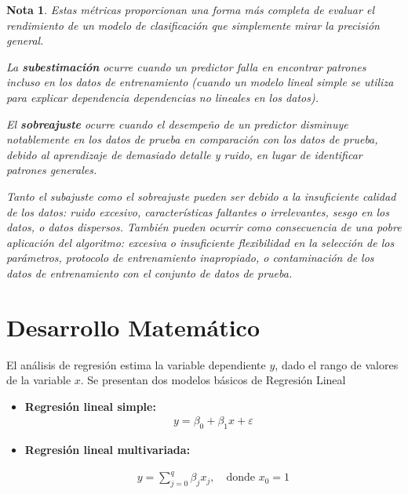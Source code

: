 \documentclass[12pt]{article}
\newtheorem{Note}{Nota}%
\begin{document}
\begin{Note}
Estas métricas proporcionan una forma más completa de evaluar el rendimiento de un modelo de clasificación que simplemente mirar la precisión general.\medskip

 La \textbf{subestimación} ocurre cuando un predictor falla en encontrar patrones incluso en los datos de entrenamiento (cuando un modelo lineal simple se utiliza para explicar dependencia dependencias no lineales en los datos). \medskip
 
 El \textbf{sobreajuste} ocurre cuando el desempeño de un predictor disminuye notablemente en los datos de prueba en comparación con los datos de prueba, debido al aprendizaje de demasiado detalle y ruido, en lugar de identificar patrones generales. \medskip
 
 \noindent Tanto el subajuste como el sobreajuste pueden ser debido a la insuficiente calidad de los datos: ruido excesivo, características faltantes o irrelevantes, sesgo en los datos, o datos dispersos. También pueden ocurrir como consecuencia de una pobre aplicación del algoritmo: excesiva o insuficiente flexibilidad en la selección de los parámetros, protocolo de entrenamiento inapropiado, o contaminación de los datos de entrenamiento con el conjunto de datos de prueba.
\end{Note}

\newpage
\section{Desarrollo Matem\'atico}

El análisis de regresión estima la variable dependiente \( y \), dado el rango de valores de la variable \( x \). Se presentan dos modelos b\'asicos de Regresi\'on Lineal

\begin{itemize} 

\item \textbf{Regresión lineal simple:}
\begin{eqnarray*}
y = \beta_0 + \beta_1 x + \varepsilon
\end{eqnarray*}
    
\item \textbf{Regresión lineal multivariada:}

\begin{eqnarray*}
y = \sum_{j=0}^{q} \beta_j x_j, \quad \text{donde } x_0 = 1
\end{eqnarray*}

\end{itemize}
\end{document}
